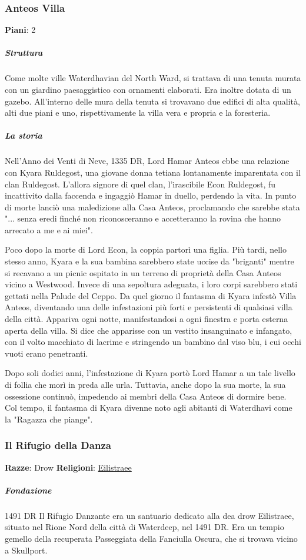 \documentclass{article}
\begin{document}
\subsubsection{Anteos Villa}
\textbf{Piani}: 2\newline

\subparagraph{Struttura}
Come molte ville Waterdhavian del North Ward, si trattava di una tenuta murata con un giardino paesaggistico con ornamenti elaborati. Era inoltre dotata di un gazebo. All'interno delle mura della tenuta si trovavano due edifici di alta qualità, alti due piani e uno, rispettivamente la villa vera e propria e la foresteria.

\subparagraph{La storia}
Nell'Anno dei Venti di Neve, 1335 DR, Lord Hamar Anteos ebbe una relazione con Kyara Ruldegost, una giovane donna tetiana lontanamente imparentata con il clan Ruldegost. L'allora signore di quel clan, l'irascibile Econ Ruldegost, fu incattivito dalla faccenda e ingaggiò Hamar in duello, perdendo la vita. In punto di morte lanciò una maledizione alla Casa Anteos, proclamando che sarebbe stata "... senza eredi finché non riconosceranno e accetteranno la rovina che hanno arrecato a me e ai miei".

Poco dopo la morte di Lord Econ, la coppia partorì una figlia. Più tardi, nello stesso anno, Kyara e la sua bambina sarebbero state uccise da "briganti" mentre si recavano a un picnic ospitato in un terreno di proprietà della Casa Anteos vicino a Westwood. Invece di una sepoltura adeguata, i loro corpi sarebbero stati gettati nella Palude del Ceppo.
Da quel giorno il fantasma di Kyara infestò Villa Anteos, diventando una delle infestazioni più forti e persistenti di qualsiasi villa della città. Appariva ogni notte, manifestandosi a ogni finestra e porta esterna aperta della villa. Si dice che apparisse con un vestito insanguinato e infangato, con il volto macchiato di lacrime e stringendo un bambino dal viso blu, i cui occhi vuoti erano penetranti.

Dopo soli dodici anni, l'infestazione di Kyara portò Lord Hamar a un tale livello di follia che morì in preda alle urla. Tuttavia, anche dopo la sua morte, la sua ossessione continuò, impedendo ai membri della Casa Anteos di dormire bene. Col tempo, il fantasma di Kyara divenne noto agli abitanti di Waterdhavi come la "Ragazza che piange".

\subsubsection{Il Rifugio della Danza}
\textbf{Razze}: Drow\newline
\textbf{Religioni}: \hyperlink{https://forgottenrealms.fandom.com/wiki/Eilistraee}{Eilistraee}
\subparagraph{Fondazione}
1491 DR Il Rifugio Danzante era un santuario dedicato alla dea drow Eilistraee, situato nel Rione Nord della città di Waterdeep, nel 1491 DR. Era un tempio gemello della recuperata Passeggiata della Fanciulla Oscura, che si trovava vicino a Skullport.
\end{document}

